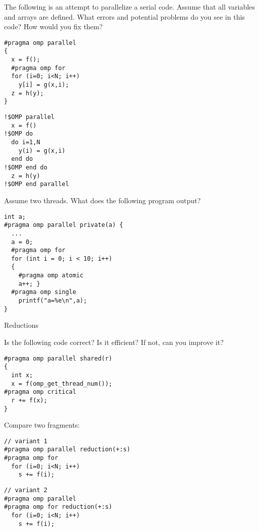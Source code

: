  {}

The following is an attempt to parallelize a serial code.
Assume that all variables and arrays are defined.
What errors and potential problems do you see in this code? How would you fix them?

\begin{multicols}{2}
\lstset{language=C} %
\small
\begin{lstlisting}
#pragma omp parallel
{
  x = f();
  #pragma omp for
  for (i=0; i<N; i++)
    y[i] = g(x,i);
  z = h(y);
}
\end{lstlisting}
\columnbreak

\lstset{language=Fortran} %
\begin{lstlisting}
!$OMP parallel
  x = f()
!$OMP do
  do i=1,N
    y(i) = g(x,i)
  end do
!$OMP end do 
  z = h(y)
!$OMP end parallel
\end{lstlisting}
\end{multicols}


\vfill\pagebreak

 {}

Assume two threads. What does the following program output?

\begin{lstlisting}
int a;
#pragma omp parallel private(a) {
  ...
  a = 0;
  #pragma omp for
  for (int i = 0; i < 10; i++)
  {
    #pragma omp atomic
    a++; }
  #pragma omp single
    printf("a=%e\n",a);
}
\end{lstlisting}

 {Reductions}

 {}

Is the following code correct? Is it efficient? If not, can you improve it?
\begin{verbatim}
#pragma omp parallel shared(r)
{
  int x;
  x = f(omp_get_thread_num());
#pragma omp critical
  r += f(x);
}
\end{verbatim}

 {}

Compare two fragments:
\begin{multicols}{2}
\lstset{language=C}
\begin{lstlisting}
// variant 1
#pragma omp parallel reduction(+:s)
#pragma omp for
  for (i=0; i<N; i++)
    s += f(i);
\end{lstlisting}
\columnbreak
\begin{lstlisting}
// variant 2
#pragma omp parallel 
#pragma omp for reduction(+:s)
  for (i=0; i<N; i++)
    s += f(i);
\end{lstlisting}
\end{multicols}

